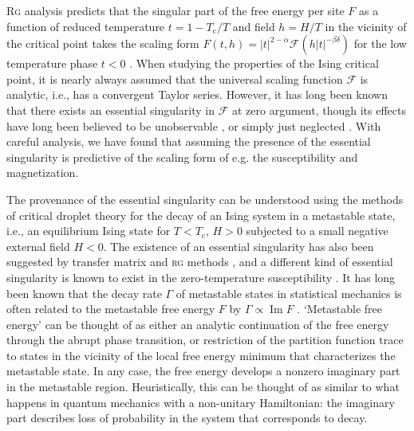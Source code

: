 \documentclass[aps,prl,reprint]{revtex4-1}
\def\im{\mathop{\mathrm{Im}}\nolimits}
\def\c{\mathrm c}
\def\fF{\mathcal F}  %
\begin{document}
\textsc{Rg} analysis predicts that the singular part of the free energy per
site $F$ as a function of reduced temperature $t=1-T_\c/T$ and field $h=H/T$
in the vicinity of the critical point takes the scaling form
$F(t,h)=|t|^{2-\alpha}\fF(h|t|^{-\beta\delta})$ for the low temperature phase
$t<0$ \cite{cardy.1996.scaling}. When studying the properties of the Ising
critical point, it is nearly always assumed that the universal scaling
function $\fF$ is analytic, i.e., has a convergent Taylor series. However, it
has long been known that there exists an essential singularity in $\fF$ at
zero argument, though its effects have long been believed to be unobservable
\cite{fisher.1967.condensation}, or simply just neglected
\cite{guida.1997.3dising,schofield.1969.parametric,schofield.1969.correlation,caselle.2001.critical,josephson.1969.equation,fisher.1999.trigonometric}.
With careful analysis, we have found that assuming the presence of the
essential singularity is predictive of the scaling form of e.g. the
susceptibility and magnetization.

The provenance of the essential singularity can be understood using the
methods of critical droplet theory for the decay of an Ising system in a
metastable state, i.e., an equilibrium Ising state for $T<T_\c$, $H>0$
subjected to a small negative external field $H<0$. The existence of an
essential singularity has also been suggested by transfer matrix
\cite{mccraw.1978.metastability,enting.1980.investigation,mangazeev.2008.variational,mangazeev.2010.scaling} and \textsc{rg}
methods \cite{klein.1976.essential}, and a different kind of essential
singularity is known to exist in the zero-temperature susceptibility
\cite{orrick.2001.susceptibility,chan.2011.ising,guttmann.1996.solvability,nickel.1999.singularity,nickel.2000.addendum,assis.2017.analyticity}.  It has long been known that the decay
rate $\Gamma$ of metastable states in statistical mechanics is often related
to the metastable free energy $F$ by $\Gamma\propto\im F$
\cite{langer.1969.metastable,penrose.1987.rigorous,gaveau.1989.analytic,privman.1982.analytic}.
`Metastable free energy' can be thought of as either an analytic continuation
of the free energy through the abrupt phase transition, or restriction of the
partition function trace to states in the vicinity of the local free energy
minimum that characterizes the metastable state. In any case, the free energy
develops a nonzero imaginary part in the metastable region. Heuristically,
this can be thought of as similar to what happens in quantum mechanics with a
non-unitary Hamiltonian: the imaginary part describes loss of probability in
the system that corresponds to decay. 
\end{document}
